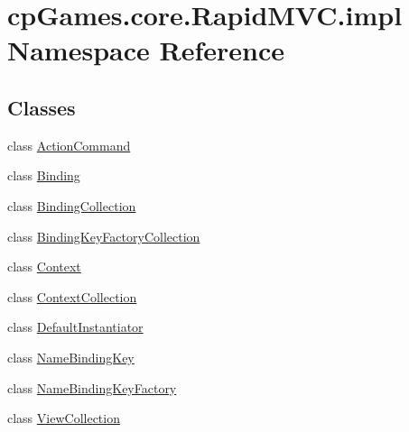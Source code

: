 \hypertarget{namespacecp_games_1_1core_1_1_rapid_m_v_c_1_1impl}{}\section{cp\+Games.\+core.\+Rapid\+M\+V\+C.\+impl Namespace Reference}
\label{namespacecp_games_1_1core_1_1_rapid_m_v_c_1_1impl}
\subsection*{Classes}
\begin{DoxyCompactItemize}
\item 
class \mbox{\hyperlink{classcp_games_1_1core_1_1_rapid_m_v_c_1_1impl_1_1_action_command}{Action\+Command}}
\item 
class \mbox{\hyperlink{classcp_games_1_1core_1_1_rapid_m_v_c_1_1impl_1_1_binding}{Binding}}
\item 
class \mbox{\hyperlink{classcp_games_1_1core_1_1_rapid_m_v_c_1_1impl_1_1_binding_collection}{Binding\+Collection}}
\item 
class \mbox{\hyperlink{classcp_games_1_1core_1_1_rapid_m_v_c_1_1impl_1_1_binding_key_factory_collection}{Binding\+Key\+Factory\+Collection}}
\item 
class \mbox{\hyperlink{classcp_games_1_1core_1_1_rapid_m_v_c_1_1impl_1_1_context}{Context}}
\item 
class \mbox{\hyperlink{classcp_games_1_1core_1_1_rapid_m_v_c_1_1impl_1_1_context_collection}{Context\+Collection}}
\item 
class \mbox{\hyperlink{classcp_games_1_1core_1_1_rapid_m_v_c_1_1impl_1_1_default_instantiator}{Default\+Instantiator}}
\item 
class \mbox{\hyperlink{classcp_games_1_1core_1_1_rapid_m_v_c_1_1impl_1_1_name_binding_key}{Name\+Binding\+Key}}
\item 
class \mbox{\hyperlink{classcp_games_1_1core_1_1_rapid_m_v_c_1_1impl_1_1_name_binding_key_factory}{Name\+Binding\+Key\+Factory}}
\item 
class \mbox{\hyperlink{classcp_games_1_1core_1_1_rapid_m_v_c_1_1impl_1_1_view_collection}{View\+Collection}}
\end{DoxyCompactItemize}
